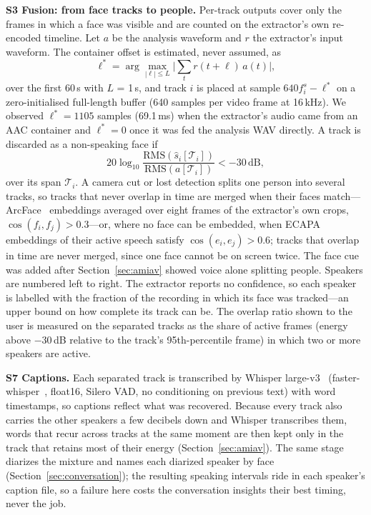 \documentclass[conference]{IEEEtran}
\newcommand{\dB}{\,dB\xspace}
\begin{document}
\textbf{S3 Fusion: from face tracks to people.} Per-track outputs cover only the frames in which a face was visible and are counted on the extractor's own re-encoded timeline. Let $a$ be the analysis waveform and $r$ the extractor's input waveform. The container offset is estimated, never assumed, as
\begin{equation}
\ell^{*} = \arg\max_{|\ell|\le L}\Big|\sum_{t} r(t+\ell)\,a(t)\Big|,
\label{eq:lag}
\end{equation}
over the first 60\,s with $L$ = 1\,s, and track $i$ is placed at sample $640 f_i^{s}-\ell^{*}$ on a zero-initialised full-length buffer (640 samples per video frame at 16\,kHz). We observed $\ell^{*}=1105$ samples (69.1\,ms) when the extractor's audio came from an AAC container and $\ell^{*}=0$ once it was fed the analysis WAV directly. A track is discarded as a non-speaking face if
\begin{equation}
20\log_{10}\frac{\mathrm{RMS}(\hat{s}_i[\mathcal{T}_i])}{\mathrm{RMS}(a[\mathcal{T}_i])} < -30\,\mathrm{dB},
\label{eq:silent}
\end{equation}
over its span $\mathcal{T}_i$. A camera cut or lost detection splits one person into several tracks, so tracks that never overlap in time are merged when their faces match---ArcFace~\cite{deng2019arcface} embeddings averaged over eight frames of the extractor's own crops, $\cos(f_i,f_j)>0.3$---or, where no face can be embedded, when ECAPA~\cite{desplanques2020ecapa} embeddings of their active speech satisfy $\cos(e_i,e_j)>0.6$; tracks that overlap in time are never merged, since one face cannot be on screen twice. The face cue was added after Section~\ref{sec:amiav} showed voice alone splitting people. Speakers are numbered left to right. The extractor reports no confidence, so each speaker is labelled with the fraction of the recording in which its face was tracked---an upper bound on how complete its track can be. The overlap ratio shown to the user is measured on the separated tracks as the share of active frames (energy above $-30$\dB relative to the track's 95th-percentile frame) in which two or more speakers are active.

\textbf{S7 Captions.} Each separated track is transcribed by Whisper large-v3~\cite{radford2023whisper} (faster-whisper~\cite{fasterwhisper}, float16, Silero VAD, no conditioning on previous text) with word timestamps, so captions reflect what was recovered. Because every track also carries the other speakers a few decibels down and Whisper transcribes them, words that recur across tracks at the same moment are then kept only in the track that retains most of their energy (Section~\ref{sec:amiav}). The same stage diarizes the mixture and names each diarized speaker by face (Section~\ref{sec:conversation}); the resulting speaking intervals ride in each speaker's caption file, so a failure here costs the conversation insights their best timing, never the job.
\end{document}
